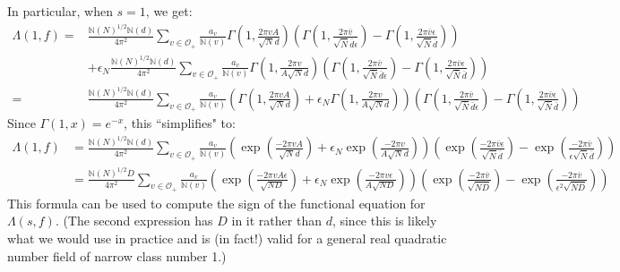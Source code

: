 \documentclass{article}
\theoremstyle{plain}
\begin{document}
In particular, when $s=1$, we get:
\begin{equation*}
\begin{split}
\Lambda(1,f)= & \frac{\mathbb{N}(N)^{1/2}\mathbb{N}(d)}{4\pi^2} \sum_{v \in \mathcal{O}_+} \frac{a_v}{\mathbb{N}(v)} \Gamma\left(1, \frac{2\pi v A}{\sqrt{N}d}\right) \left(\Gamma\left(1,\frac{2 \pi \bar{v}}{\sqrt{\bar{N}}\bar{d} \epsilon} \right)-  \Gamma\left(1,\frac{2 \pi \bar{v}\epsilon}{\sqrt{\bar{N}}\bar{d} } \right) \right) \\
&+  \epsilon_N \frac{\mathbb{N}(N)^{1/2}\mathbb{N}(d)}{4\pi^2} \sum_{v \in \mathcal{O}_+} \frac{a_v}{\mathbb{N}(v)} \Gamma\left(1, \frac{2\pi v }{A\sqrt{N}d}\right) \left(\Gamma\left(1,\frac{2 \pi \bar{v}}{\sqrt{\bar{N}}\bar{d} \epsilon} \right)-  \Gamma\left(1,\frac{2 \pi \bar{v}\epsilon}{\sqrt{\bar{N}}\bar{d} } \right) \right)\\
= &  \frac{\mathbb{N}(N)^{1/2}\mathbb{N}(d)}{4\pi^2} \sum_{v \in \mathcal{O}_+} \frac{a_v}{\mathbb{N}(v)} \left( \Gamma\left(1, \frac{2\pi v A}{\sqrt{N}d}\right) +\epsilon_N\Gamma\left(1, \frac{2\pi v }{A\sqrt{N}d}\right) \right)\left(\Gamma\left(1,\frac{2 \pi \bar{v}}{\sqrt{\bar{N}}\bar{d} \epsilon} \right)-  \Gamma\left(1,\frac{2 \pi \bar{v}\epsilon}{\sqrt{\bar{N}}\bar{d} } \right) \right)
\end{split}
\end{equation*}
Since $\Gamma(1,x)=e^{-x}$, this ``simplifies" to:
\begin{align*}
\Lambda(1,f) & = \frac{\mathbb{N}(N)^{1/2} \mathbb{N}(d)}{4\pi^2} \sum_{v \in \mathcal{O}_+} \frac{a_v}{\mathbb{N}(v)} \left( \exp\left(\frac{-2\pi vA}{\sqrt{N} d}\right) + \epsilon_N \exp\left(\frac{-2\pi v}{A\sqrt{N} d}\right) \right) \left( \exp \left(\frac{-2\pi \bar{v} \epsilon}{\sqrt{\bar{N}}\bar{d}}\right) -  \exp \left(\frac{-2\pi \bar{v}}{\epsilon\sqrt{\bar{N}}\bar{d}}\right)\right)\\
& = \frac{\mathbb{N}(N)^{1/2} D}{4\pi^2} \sum_{v \in \mathcal{O}_+} \frac{a_v}{\mathbb{N}(v)} \left( \exp\left(\frac{-2\pi vA\epsilon}{\sqrt{ND} }\right) + \epsilon_N \exp\left(\frac{-2\pi v\epsilon}{A\sqrt{ND}}\right) \right) \left( \exp \left(\frac{-2\pi \bar{v} }{\sqrt{\bar{N}D}}\right) -  \exp \left(\frac{-2\pi \bar{v}}{\epsilon^2\sqrt{\bar{N}D}}\right)\right)
\end{align*}
This formula can be used to compute the sign of the functional equation for $\Lambda(s,f)$. (The second expression has $D$ in it rather than $d$, since this is likely what we would use in practice and is (in fact!) valid for a general real quadratic number field of narrow class number 1.)
\end{document}
